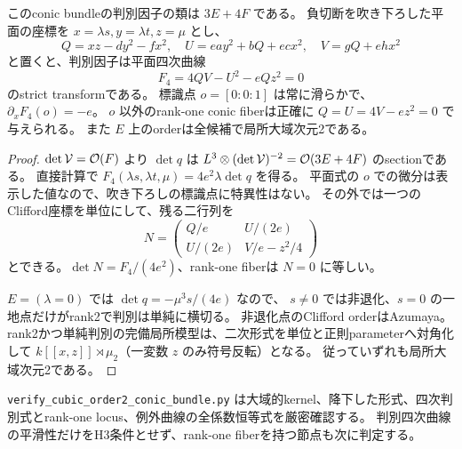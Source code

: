\begin{proposition}
\label{prop:h3-order2-plane-quartic}
このconic bundleの判別因子の類は $3E+4F$ である。
負切断を吹き下ろした平面の座標を $x=\lambda s,y=\lambda t,z=\mu$ とし、
\[
 Q=xz-dy^2-fx^2,\quad U=ea y^2+bQ+ec x^2,\quad V=gQ+eh x^2
\]
と置くと、判別因子は平面四次曲線
\begin{equation}\label{eq:h3-order2-plane-quartic}
 F_4=4QV-U^2-eQz^2=0
\end{equation}
のstrict transformである。
標識点 $o=[0:0:1]$ は常に滑らかで、$\partial_xF_4(o)=-e$。
$o$ 以外のrank-one conic fiberは正確に $Q=U=4V-ez^2=0$ で与えられる。
また $E$ 上のorderは全候補で局所大域次元2である。
\end{proposition}
\begin{proof}
$\det\mathcal V=\mathcal O(F)$ より $\det q$ は
$L^3\otimes(\det\mathcal V)^{-2}=\mathcal O(3E+4F)$ のsectionである。
直接計算で $F_4(\lambda s,\lambda t,\mu)=4e^2\lambda\det q$ を得る。
平面式の $o$ での微分は表示した値なので、吹き下ろしの標識点に特異性はない。
その外では一つのClifford座標を単位にして、残る二行列を
\[
 N=\begin{pmatrix}Q/e&U/(2e)\\U/(2e)&V/e-z^2/4\end{pmatrix}
\]
とできる。$\det N=F_4/(4e^2)$、rank-one fiberは $N=0$ に等しい。

$E=(\lambda=0)$ では $\det q=-\mu^3s/(4e)$ なので、
$s\ne0$ では非退化、$s=0$ の一地点だけがrank2で判別は単純に横切る。
非退化点のClifford orderはAzumaya。
rank2かつ単純判別の完備局所模型は、二次形式を単位と正則parameterへ対角化して
$k[[x,z]]\rtimes\mu_2$（一変数 $z$ のみ符号反転）となる。
従っていずれも局所大域次元2である。
\end{proof}
\texttt{verify\_\allowbreak{}cubic\_\allowbreak{}order2\_\allowbreak{}conic\_\allowbreak{}bundle.py}
は大域的kernel、降下した形式、四次判別式とrank-one locus、例外曲線の全係数恒等式を厳密確認する。
判別四次曲線の平滑性だけをH3条件とせず、rank-one fiberを持つ節点も次に判定する。

